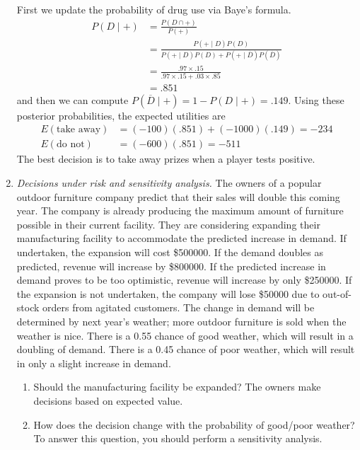 \begin{enumerate}
\begin{solution}
\bs First we update the probability of drug use via Baye's formula.
\begin{align*}
P(D \mid +) &= \frac{P(D \cap +)}{P(+)} \\
&= \frac{P(+ \mid D)P(D)}{P(+ \mid D)P(D) + P(+ \mid \overline{D})P(\overline{D})} \\
&= \frac{.97 \times .15}{.97 \times .15 + .03 \times .85} \\
&= .851
\end{align*}
and then we can compute $P(\overline{D} \mid +) = 1 - P(D \mid +) = .149$.
Using these posterior probabilities, the expected utilities are
\begin{align*}
E(\text{take away}) &= (-100)(.851) + (-1000)(.149) = -234 \\
E(\text{do not}) &= (-600)(.851) = -511
\end{align*}
The best decision is to take away prizes when a player tests positive.
\end{solution}

\item \emph {Decisions under risk and sensitivity analysis.}  The
  owners of a popular outdoor furniture company predict that their
  sales will double this coming year. The company is already producing
  the maximum amount of furniture possible in their current
  facility. They are considering expanding their manufacturing
  facility to accommodate the predicted increase in demand. If
  undertaken, the expansion will cost \$\num{500000}. If the demand
  doubles as predicted, revenue will increase by \$\num{800000}.  If
  the predicted increase in demand proves to be too optimistic,
  revenue will increase by only \$\num{250000}.  If the expansion is
  not undertaken, the company will lose \$\num{50000} due to
  out-of-stock orders from agitated customers.  The change in demand
  will be determined by next year's weather; more outdoor furniture is
  sold when the weather is nice.  There is a 0.55 chance of good
  weather, which will result in a doubling of demand. There is a 0.45
  chance of poor weather, which will result in only a slight increase
  in demand.

\begin{enumerate}
\item Should the manufacturing facility be expanded? The owners make
  decisions based on expected value.
\item How does the decision change with the probability of good/poor
  weather? To answer this question, you should perform a sensitivity
  analysis.
\end{enumerate}


\end{enumerate}
